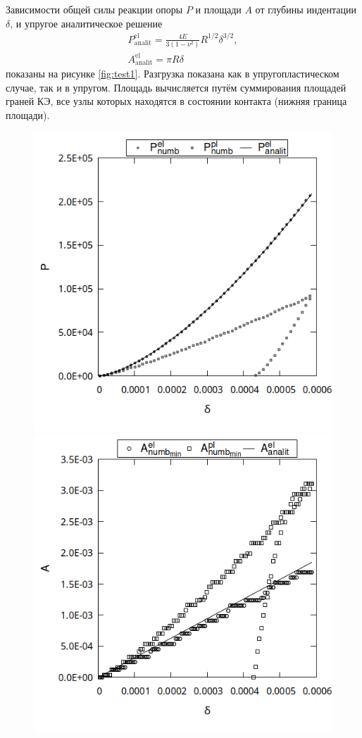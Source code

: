 Зависимости общей силы реакции опоры $P$ и площади $A$ от глубины индентации $\delta$, и упругое аналитическое решение
\begin{equation}
\begin{gathered}
P_{\mathrm{analit}}^{\mathrm{el}}=\frac{4E}{3\left(1-\nu^2 \right)}R^{1/2}\delta^{3/2},\\
A_{\mathrm{analit}}^{\mathrm{el}}=\pi R\delta
\end{gathered}
\end{equation}
показаны на рисунке \ref{fig:test1}. Разгрузка показана как в упругопластическом случае, так и в упругом. Площадь вычисляется путём суммирования площадей граней КЭ, все узлы которых находятся в состоянии контакта (нижняя граница площади).
\begin{figure}[!h]
	\centering
	\includegraphics[height=0.3\textheight]{pictures/P_d.png}
	\includegraphics[height=0.3\textheight]{pictures/A_d.png}

\end{figure}
